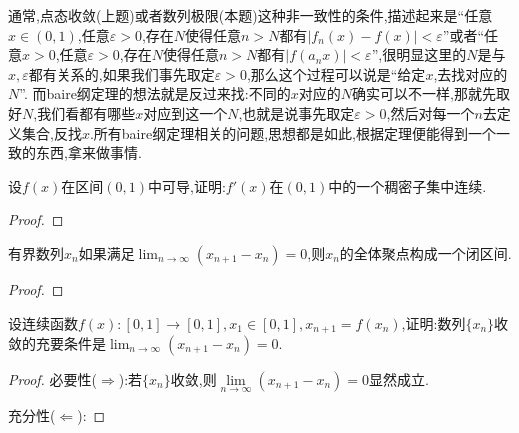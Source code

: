 \documentclass[../../main.tex]{subfiles}
\begin{document}
\begin{remark}
通常,点态收敛(上题)或者数列极限(本题)这种非一致性的条件,描述起来是“任意\(x\in(0,1)\),任意\(\varepsilon > 0\),存在\(N\)使得任意\(n > N\)都有\(|f_n(x)-f(x)|<\varepsilon\)”或者“任意\(x > 0\),任意\(\varepsilon > 0\),存在\(N\)使得任意\(n > N\)都有\(|f(a_nx)|<\varepsilon\)”,很明显这里的\(N\)是与\(x,\varepsilon\)都有关系的,如果我们事先取定\(\varepsilon > 0\),那么这个过程可以说是“给定\(x\),去找对应的\(N\)”.
而baire纲定理的想法就是反过来找:不同的\(x\)对应的\(N\)确实可以不一样,那就先取好\(N\),我们看都有哪些\(x\)对应到这一个\(N\),也就是说事先取定\(\varepsilon > 0\),然后对每一个\(n\)去定义集合,反找\(x\).所有baire纲定理相关的问题,思想都是如此,根据定理便能得到一个一致的东西,拿来做事情.
\end{remark}

\begin{example}
设\(f(x)\)在区间\((0,1)\)中可导,证明:\(f'(x)\)在\((0,1)\)中的一个稠密子集中连续.
\end{example}
\begin{proof}

\end{proof}

\begin{lemma}
有界数列\(x_n\)如果满足\(\lim_{n\to\infty}(x_{n + 1}-x_n)=0\),则\(x_n\)的全体聚点构成一个闭区间.
\end{lemma}
\begin{proof}

\end{proof}

\begin{example}
设连续函数\(f(x):[0,1]\to[0,1],x_1\in[0,1],x_{n + 1}=f(x_n)\),证明:数列\(\{x_n\}\)收敛的充要条件是\(\lim_{n\to\infty}(x_{n + 1}-x_n)=0\).
\end{example}
\begin{proof}
必要性($\Rightarrow$):若$\{x_n\}$收敛,则$\underset{n\rightarrow \infty}{\lim}\left( x_{n+1}-x_n \right) =0$显然成立.

充分性($\Leftarrow$):
\end{proof}
\end{document}

